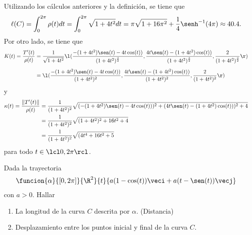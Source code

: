 \documentclass[a4,11pt]{aleph-examen}
\begin{document}
\begin{preguntas}
\begin{respuesta}
	Utilizando los cálculos anteriores y la definición, se tiene que
	\[
		\ell(C)=\int_0^{2\pi}\rho(t)dt=\int_0^{2\pi}\sqrt{1 + 4t^2}dt=
		\pi \sqrt{1 + 16 \pi^2} + \dfrac{1}{4} \senh^{-1}(4\pi)\approx 40.4.
	\]
	Por otro lado, se tiene que
	\begin{align*}
		K(t)=\dfrac{T'(t)}{\rho(t)}
		&=\dfrac{1}{\sqrt{1+4t^2}}\l(\dfrac{-(1+4t^2) \sen(t) -4t\cos(t))}{(1 + 4 t^2)^\frac{3}{2}},
		\dfrac{ 4t\sen(t)-(1+4t^2) \cos(t))}{(1 + 4 t^2)^\frac{3}{2}},
		\dfrac{ 2}{(1 + 4 t^2)^\frac{3}{2}}\r)\\[2mm]
		&=\l(\dfrac{-(1+4t^2) \sen(t) -4t\cos(t))}{(1 + 4 t^2)^2},
		\dfrac{ 4t\sen(t)-(1+4t^2) \cos(t))}{(1 + 4 t^2)^2},
		\dfrac{ 2}{(1 + 4 t^2)^2}\r)
	\end{align*}
	y
	\begin{align*}
		\kappa(t)=\dfrac{\|T'(t)\|}{\rho(t)}
		&=\dfrac{1}{(1+4t^2)^2}
		\sqrt{(-(1+4t^2) \sen(t) -4t\cos(t)))^2
				+(4t\sen(t)-(1+4t^2) \cos(t)))^2
				+4}\\
		&=\dfrac{1}{(1+4t^2)^2}
			\sqrt{
			(1+4t^2)^2 +16t^2+4}\\
		&=\dfrac{1}{(1+4t^2)^2}
			\sqrt{
				(4 t^4 + 16 t^2 + 5}
	\end{align*}
	para todo $t\in\lcl0,2\pi\rcl$.
\end{respuesta}

\item    
	Dada la trayectoria 
 	\[
        \funcion{\alpha}{\left[0,2\pi \right]}{\R^2}{t}{a(1-\cos (t)) \veci+a(t-\sen (t)) \vecj}
    \]
	con $a>0$. Hallar 
	\begin{enumerate}
	    \item La longitud de la curva $C$ descrita por $\alpha$. (Distancia) 
	    \item Desplazamiento entre los puntos inicial y final de la curva $C$.
	\end{enumerate}
	
	\begin{respuesta}
	

\end{respuesta}
\end{preguntas}
\end{document}
